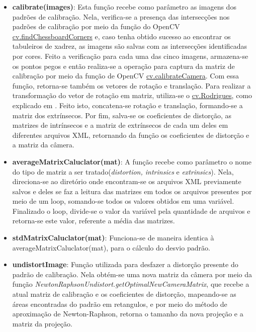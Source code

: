 \documentclass{bmvc2k}
\begin{document}
\begin{itemize}
    \item \textbf{calibrate(images)}: Esta função recebe como parâmetro as imagens dos padrões de calibração. Nela, verifica-se a presença das intersecções nos padrões de calibração por meio da função do OpenCV \href{https://docs.opencv.org/2.4/modules/calib3d/doc/camera_calibration_and_3d_reconstruction.html#findchessboardcorners}{cv.findChessboardCorners} e, caso tenha obtido sucesso ao encontrar os tabuleiros de xadrez, as imagens são salvas com as intersecções identificadas por cores. Feito a verificação para cada uma das cinco imagens, armazena-se os pontos pegos e então realiza-se a operação para captura da matriz de calibração por meio da função de OpenCV \href{https://docs.opencv.org/2.4/modules/calib3d/doc/camera_calibration_and_3d_reconstruction.html#calibratecamera}{cv.calibrateCamera}. Com essa função, retorna-se também os vetores de rotação e translação. Para realizar a transformação do vetor de rotação em matriz, utiliza-se o \href{https://docs.opencv.org/2.4/modules/calib3d/doc/camera_calibration_and_3d_reconstruction.html#rodrigues}{cv.Rodrigues}, como explicado em \cite{Grant01}. Feito isto, concatena-se rotação e translação, formando-se a matriz dos extrínsecos. Por fim, salva-se os coeficientes de distorção, as matrizes de intrínsecos e a matriz de extrínsecos de cada um deles em diferentes arquivos XML, retornando da função os coeficientes de distorção e a matriz da câmera.
    \item \textbf{averageMatrixCaluclator(mat)}: A função recebe como parâmetro o nome do tipo de matriz a ser tratado({\em distortion, intrinsics} e {\em extrinsics}). Nela, direciona-se ao diretório onde encontram-se os arquivos XML previamente salvos e deles se faz a leitura das matrizes em todos os arquivos presentes por meio de um loop, somando-se todos os valores obtidos em uma variável. Finalizado o loop, divide-se o valor da variável pela quantidade de arquivos e retorna-se este valor, referente a média das matrizes.
    \item \textbf{stdMatrixCaluclator(mat)}: Funciona-se de maneira identica à averageMatrixCaluclator(mat), para o cálculo do desvio padrão.
    \item \textbf{undistortImage}: Função utilizada para desfazer a distorção presente do padrão de calibração. Nela obtém-se uma nova matriz da câmera por meio da função {\em NewtonRaphsonUndistort.getOptimalNewCameraMatrix}\cite{Devir01}, que recebe a atual matriz de calibração e os coeficientes de distorção, mapeando-se as áreas encontradas do padrão em retangulos, e por meio do método de aproximação de Newton-Raphson, retorna o tamanho da nova projeção e a matriz da projeção.
\end{itemize}
\end{document}
